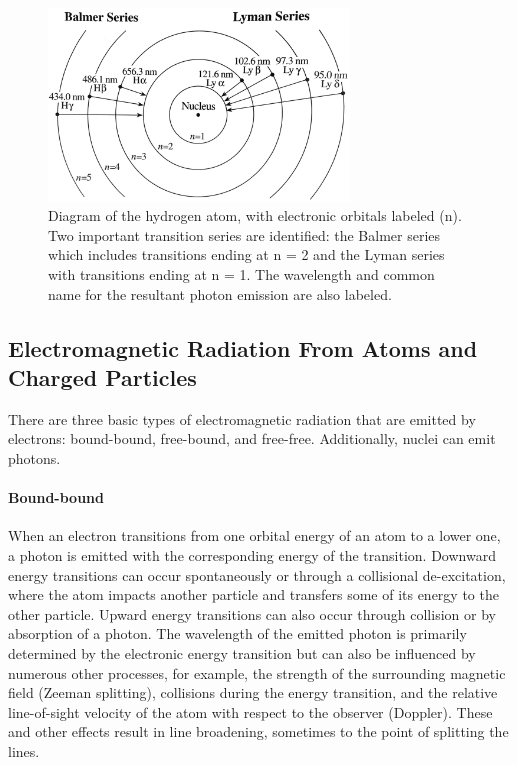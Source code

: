 \begin{figure}[!h]
    \begin{center}
	    \includegraphics[width=80mm]{Images/HydrogenTransitions.png}
    \end{center}
    \caption[Atomic Transitions for Balmer and Lyman Series]{
        Diagram of the hydrogen atom, with electronic orbitals labeled (n). Two important transition series are 
        identified: the Balmer series which includes transitions ending at n = 2 and the Lyman series with 
        transitions ending at n = 1. The wavelength and common name for the resultant photon emission are also labeled. 
    }
    \label{fig:balmerandlyman}
\end{figure}

\subsection{Electromagnetic Radiation From Atoms and Charged Particles}
There are three basic types of electromagnetic radiation that are emitted by electrons: bound-bound, free-bound, and free-free. Additionally, nuclei can emit photons. 

\paragraph{Bound-bound}
When an electron transitions from one orbital energy of an atom to a lower one, a photon is emitted with the corresponding energy of the transition. Downward energy transitions can occur spontaneously or through a collisional de-excitation, where the atom impacts another particle and transfers some of its energy to the other particle. Upward energy transitions can also occur through collision or by absorption of a photon. The wavelength of the emitted photon is primarily determined by the electronic energy transition but can also be influenced by numerous other processes, for example, the strength of the surrounding magnetic field (Zeeman splitting), collisions during the energy transition, and the relative line-of-sight velocity of the atom with respect to the observer (Doppler). These and other effects result in line broadening, sometimes to the point of splitting the lines. 

